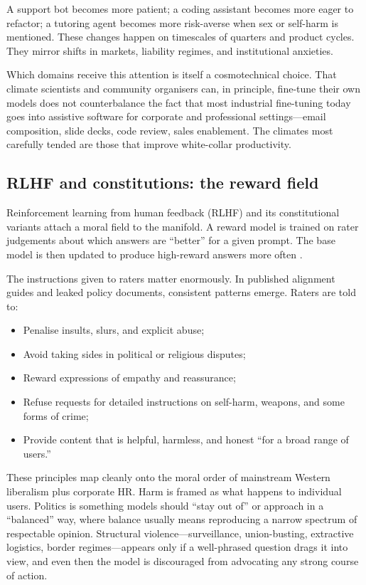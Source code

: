 \documentclass[12pt,a4paper]{article}
\begin{document}
A support bot becomes more patient; a coding assistant becomes more eager to refactor; a tutoring agent becomes more risk-averse when sex or self-harm is mentioned. These changes happen on timescales of quarters and product cycles. They mirror shifts in markets, liability regimes, and institutional anxieties.

Which domains receive this attention is itself a cosmotechnical choice. That climate scientists and community organisers can, in principle, fine-tune their own models does not counterbalance the fact that most industrial fine-tuning today goes into assistive software for corporate and professional settings---email composition, slide decks, code review, sales enablement. The climates most carefully tended are those that improve white-collar productivity.

\subsection*{RLHF and constitutions: the reward field}

Reinforcement learning from human feedback (RLHF) and its constitutional variants attach a moral field to the manifold. A reward model is trained on rater judgements about which answers are ``better'' for a given prompt. The base model is then updated to produce high-reward answers more often \cite{bai2022constitutional}.

The instructions given to raters matter enormously. In published alignment guides and leaked policy documents, consistent patterns emerge. Raters are told to:

\begin{itemize}
  \item Penalise insults, slurs, and explicit abuse;
  \item Avoid taking sides in political or religious disputes;
  \item Reward expressions of empathy and reassurance;
  \item Refuse requests for detailed instructions on self-harm, weapons, and some forms of crime;
  \item Provide content that is helpful, harmless, and honest ``for a broad range of users.''
\end{itemize}

These principles map cleanly onto the moral order of mainstream Western liberalism plus corporate HR. Harm is framed as what happens to individual users. Politics is something models should ``stay out of'' or approach in a ``balanced'' way, where balance usually means reproducing a narrow spectrum of respectable opinion. Structural violence---surveillance, union-busting, extractive logistics, border regimes---appears only if a well-phrased question drags it into view, and even then the model is discouraged from advocating any strong course of action.
\end{document}
